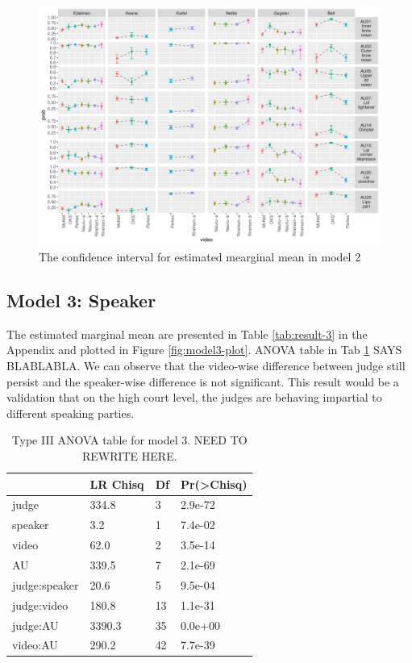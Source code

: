 \documentclass{monashthesis}
\begin{document}
\begin{figure}

{\centering \includegraphics[width=1\linewidth]{figures/model2-plot-1} 

}

\caption{The confidence interval for estimated mearginal mean in model 2}\label{fig:model2-plot}
\end{figure}

\hypertarget{model-3-speaker-1}{%
\subsection{Model 3: Speaker}\label{model-3-speaker-1}}

The estimated marginal mean are presented in Table \ref{tab:result-3} in the Appendix and plotted in Figure \ref{fig:model3-plot}. ANOVA table in Tab \ref{tab:anova-3} SAYS BLABLABLA. We can observe that the video-wise difference between judge still persist and the speaker-wise difference is not significant. This result would be a validation that on the high court level, the judges are behaving impartial to different speaking parties.

\begin{table}

\caption{\label{tab:anova-3}\label{tab:anova-3}Type III ANOVA table for model 3. NEED TO REWRITE HERE.}
\centering
\begin{tabular}[t]{l|l|l|l}
\hline
  & LR Chisq & Df & Pr(>Chisq)\\
\hline
judge & 334.8 & 3 & 2.9e-72\\
\hline
speaker & 3.2 & 1 & 7.4e-02\\
\hline
video & 62.0 & 2 & 3.5e-14\\
\hline
AU & 339.5 & 7 & 2.1e-69\\
\hline
judge:speaker & 20.6 & 5 & 9.5e-04\\
\hline
judge:video & 180.8 & 13 & 1.1e-31\\
\hline
judge:AU & 3390.3 & 35 & 0.0e+00\\
\hline
video:AU & 290.2 & 42 & 7.7e-39\\
\hline
\end{tabular}
\end{table}
\end{document}
